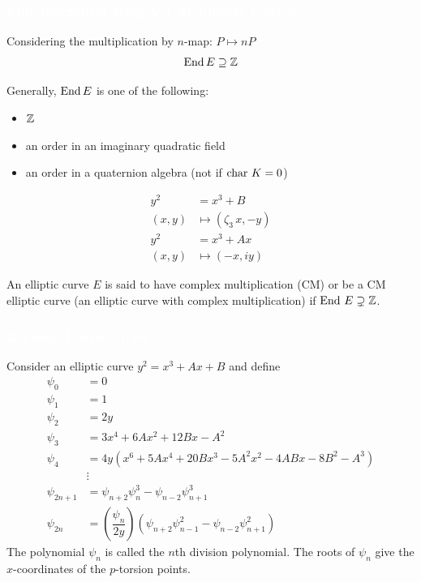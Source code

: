 \begin{frame}[plain]
\frametitle{\textcolor{white}{Endomorphism Ring \& CM Elliptic Curves}} \footnotesize

Considering the multiplication by $n$-map: $P \mapsto nP$
	\[
	\operatorname{End} E \supseteq \mathbb{Z}
	\]

Generally, $\operatorname{End} E$ is one of the following:
\begin{itemize}
\item $\mathbb{Z}$
\item an order in an imaginary quadratic field
\item an order in a quaternion algebra (not if $\text{char } K= 0$)
\end{itemize}

\begin{ex}
	\[
	\begin{aligned}
	y^2&= x^3 + B\\
	(x,y) &\mapsto (\zeta_3\, x,-y) \\
	y^2&= x^3 + Ax \\
	(x,y) &\mapsto (-x,iy)
	\end{aligned}
	\]
\end{ex}

\begin{dfn}
An elliptic curve $E$ is said to have complex multiplication (CM) or be a CM elliptic curve (an elliptic curve with complex multiplication) if $\text{End } E \supsetneq \mathbb{Z}$.
\end{dfn}
\end{frame}



\begin{frame}[plain]
\frametitle{\textcolor{white}{Division Polynomials}}
Consider an elliptic curve $y^2= x^3 + Ax + B$ and define
	\[
	\begin{aligned}
	\psi_0&= 0 \\
	\psi_1&= 1 \\
	\psi_2&= 2y \\
	\psi_3&= 3x^4 + 6Ax^2 + 12Bx - A^2 \\
	\psi_4&= 4y (x^6 + 5Ax^4 + 20Bx^3 - 5A^2x^2 - 4ABx - 8B^2 - A^3) \\
	&\vdots \\
	\psi_{2n+1}&= \psi_{n+2} \psi_n^3 - \psi_{n-2} \psi_{n+1}^3 \\
	\psi_{2n}&= \left(\dfrac{\psi_n}{2y}\right) (\psi_{n+2} \psi_{n-1}^2 - \psi_{n-2} \psi_{n+1}^2)
	\end{aligned}
	\]
The polynomial $\psi_n$ is called the $n$th division polynomial. The roots of $\psi_n$ give the $x$-coordinates of the $p$-torsion points. 
\end{frame}



